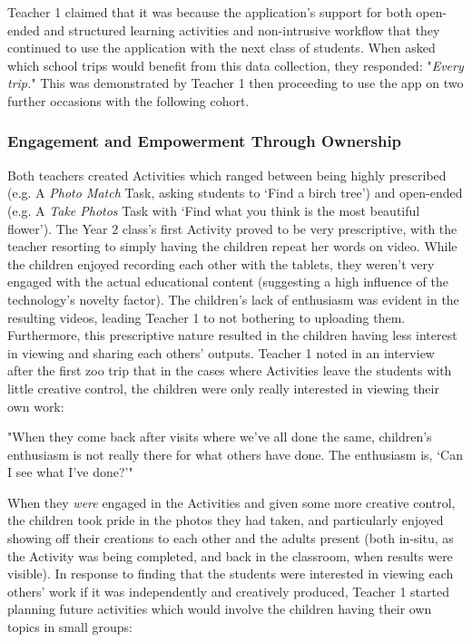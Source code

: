 Teacher 1 claimed that it was because the application's support for both open-ended and structured learning activities and non-intrusive workflow that they continued to use the application with the next class of students. When asked which school trips would benefit from this data collection, they responded: "\textit{Every trip.}" This was demonstrated by Teacher 1 then proceeding to use the app on two further occasions with the following cohort.

\subsubsection{Engagement and Empowerment Through Ownership}

Both teachers created Activities which ranged between being highly prescribed (e.g. A \textit{Photo Match} Task, asking students to ‘Find a birch tree’) and open-ended (e.g. A \textit{Take Photos} Task with ‘Find what you think is the most beautiful flower’). The Year 2 class's first Activity proved to be very prescriptive, with the teacher resorting to simply having the children repeat her words on video. While the children enjoyed recording each other with the tablets, they weren't very engaged with the actual educational content (suggesting a high influence of the technology’s novelty factor). The children's lack of enthusiasm was evident in the resulting videos, leading Teacher 1 to not bothering to uploading them. Furthermore, this prescriptive nature resulted in the children having less interest in viewing and sharing each others' outputs. Teacher 1 noted in an interview after the first zoo trip that in the cases where Activities leave the students with little creative control, the children were only really interested in viewing their own work: 

\begin{displayquote}
"When they come back after visits where we've all done the same, children's enthusiasm is not really there for what others have done. The enthusiasm is, `Can I see what I've done?'"
\end{displayquote}

When they \textit{were} engaged in the Activities and given some more creative control, the children took pride in the photos they had taken, and particularly enjoyed showing off their creations to each other and the adults present (both in-situ, as the Activity was being completed, and back in the classroom, when results were visible). In response to finding that the students were interested in viewing each others' work if it was independently and creatively produced, Teacher 1 started planning future activities which would involve the children having their own topics in small groups: 

